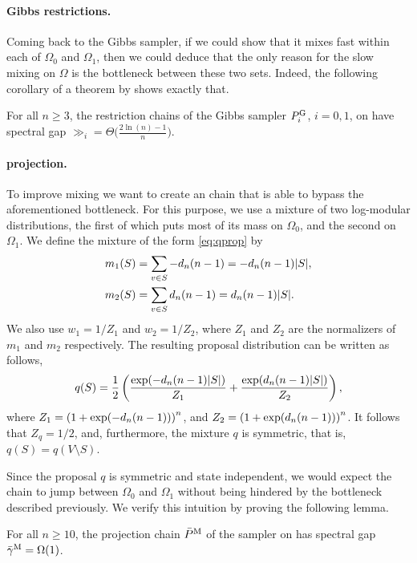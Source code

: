 \paragraph{Gibbs restrictions.}
Coming back to the Gibbs sampler, if we could show that it mixes fast within each of $\Omega_0$ and $\Omega_1$, then we could deduce that the only reason for the slow mixing on $\Omega$ is the bottleneck between these two sets.
Indeed, the following corollary of a theorem by \cite{ding09} shows exactly that.
\begin{cor} \label{cor:grest}
  For all $n \geq 3$, the restriction chains of the Gibbs sampler $P^{\mathrm{G}}_i$, $i = 0, 1$, on \ising{} have spectral gap $\gg_i = \Theta\big(\displaystyle\tfrac{2\ln(n) - 1}{n}\big)$.
\end{cor}

\paragraph{\Ms{} projection.}
To improve mixing we want to create an \Ms{} chain that is able to bypass the aforementioned bottleneck.
For this purpose, we use a mixture of two log-modular distributions, the first of which puts most of its mass on $\Omega_0$, and the second on $\Omega_1$.
We define the mixture of the form \eqref{eq:qprop} by
\begin{align*}
  m_1(S) &= \sum_{v \in S} -d_n (n-1) = -d_n (n-1) |S|,\\
  m_2(S) &= \sum_{v \in S} d_n (n-1) = d_n (n-1) |S|.
\end{align*}
We also use $w_1 = 1 / Z_1$ and $w_2 = 1 / Z_2$, where $Z_1$ and $Z_2$ are the normalizers of $m_1$ and $m_2$ respectively.
The resulting proposal distribution can be written as follows,
\begin{align} \label{eq:qdef}
  q(S) = \frac12\left( \frac{\exp(-d_n (n-1)|S|)}{Z_1} + \frac{\exp(d_n (n-1)|S|)}{Z_2}\right),
\end{align}
where $Z_1 = \left(1 + \exp(-d_n(n-1))\right)^n$, and $Z_2 = \left(1 + \exp(d_n(n-1))\right)^n$.
It follows that $Z_q = 1 / 2$, and, furthermore, the mixture $q$ is symmetric, that is, $q(S) = q(V \setminus S)$.

Since the proposal $q$ is symmetric and state independent, we would expect the \Ms{} chain to jump between $\Omega_0$ and $\Omega_1$ without being hindered by the bottleneck described previously.
We verify this intuition by proving the following lemma.
\begin{lemma} \label{lem:mproj}
  For all $n \geq 10$, the projection chain $\bar{P}^{\mathrm{M}}$ of the \Ms{} sampler on \ising{} has spectral gap $\bar{\gamma}^{\mathrm{M}} = \Omega(1)$.
\end{lemma}

